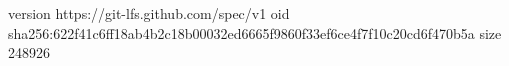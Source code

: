 version https://git-lfs.github.com/spec/v1
oid sha256:622f41c6ff18ab4b2c18b00032ed6665f9860f33ef6ce4f7f10c20cd6f470b5a
size 248926
